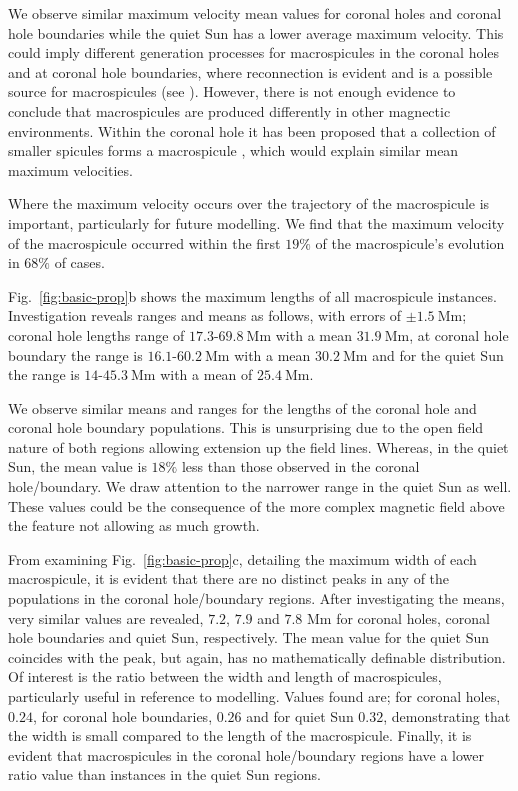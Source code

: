 We observe similar maximum velocity mean values for coronal holes and coronal hole boundaries while the quiet Sun has a lower average maximum velocity. This could imply different generation processes for macrospicules in the coronal holes and at coronal hole boundaries, where reconnection is evident \citep{Patsourakos1999} and is a possible source for macrospicules (see \citealt{Heggland2009}). However, there is not enough evidence to conclude that macrospicules are produced differently in other magnectic environments. Within the coronal hole it has been proposed that a collection of smaller spicules forms a macrospicule \citep{Scullion2009}, which would explain similar mean maximum velocities.

Where the maximum velocity occurs over the trajectory of the macrospicule is important, particularly for future modelling. We find that the maximum velocity of the macrospicule occurred within the first $19\%$ of the macrospicule's evolution in $68\%$ of cases.

Fig.~\ref{fig:basic-prop}b shows the maximum lengths of all macrospicule instances. Investigation reveals ranges and means as follows, with errors of $\pm1.5\ \textrm{Mm}$; coronal hole lengths range of $17.3$-$69.8\ \textrm{Mm}$ with a mean $31.9\ \textrm{Mm}$, at coronal hole boundary the range is $16.1$-$60.2\ \textrm{Mm}$ with a mean $30.2\ \textrm{Mm}$ and for the quiet Sun the range is $14$-$45.3\ \textrm{Mm}$ with a mean of $25.4\ \textrm{Mm}$. 

We observe similar means and ranges for the lengths of the coronal hole and coronal hole boundary populations. This is unsurprising due to the open field nature of both regions allowing extension up the field lines. Whereas, in the quiet Sun, the mean value is $18\%$ less than those observed in the coronal hole/boundary. We draw attention to the narrower range in the quiet Sun as well. These values could be the consequence of the more complex magnetic field above the feature not allowing as much growth. 

From examining Fig.~\ref{fig:basic-prop}c, detailing the maximum width of each macrospicule, it is evident that there are no distinct peaks in any of the populations in the coronal hole/boundary regions. After investigating the means, very similar values are revealed, $7.2$, $7.9$ and $7.8$ Mm for coronal holes, coronal hole boundaries and quiet Sun, respectively. The mean value for the quiet Sun coincides with the peak, but again, has no mathematically definable distribution. Of interest is the ratio between the width and length of macrospicules, particularly useful in reference to modelling. Values found are; for coronal holes, $0.24$, for coronal hole boundaries, $0.26$ and for quiet Sun $0.32$, demonstrating that the width is small compared to the length of the macrospicule. Finally, it is evident that macrospicules in the coronal hole/boundary regions have a lower ratio value than instances in the quiet Sun regions.

